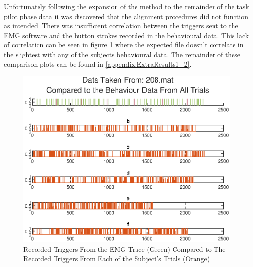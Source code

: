 Unfortunately following the expansion of the method to the remainder of the task pilot phase data it was discovered that the alignment procedures did not function as intended. There was insufficient correlation between the triggers sent to the EMG software and the button strokes recorded in the behavioural data. This lack of correlation can be seen in figure \ref{fig:EMG_TrigComparisonB} where the expected file doesn't correlate in the slightest with any of the subjects behavioural data. The remainder of these comparison plots can be found in \ref{appendix:ExtraResults1_2}.
\begin{figure}[H]
    \centering
    \includegraphics[width=0.75\linewidth]{figures/EMG_Trigger_Comparison_b.eps}
    \caption{Recorded Triggers From the EMG Trace (Green) Compared to The Recorded Triggers From Each of the Subject's Trials (Orange)}
    \label{fig:EMG_TrigComparisonB}
\end{figure}